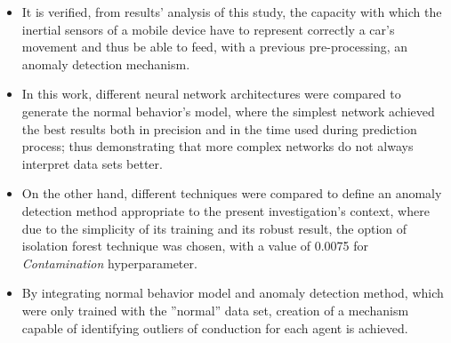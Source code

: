 \begin{itemize}
\item It is verified, from results' analysis of this study, the capacity with which the inertial sensors of a mobile device have to represent correctly a car's movement and thus be able to feed, with a previous pre-processing, an anomaly detection mechanism.
\item In this work, different neural network architectures were compared to generate the normal behavior's model, where the simplest network achieved the best results both in precision and in the time used during prediction process; thus demonstrating that more complex networks do not always interpret data sets better.
\item On the other hand, different techniques were compared to define an anomaly detection method appropriate to the present investigation's context, where due to the simplicity of its training and its robust result, the option of isolation forest technique was chosen, with a value of 0.0075 for \textit{Contamination} hyperparameter.
\item By integrating normal behavior model and anomaly detection method, which were only trained with the ''normal'' data set, creation of a mechanism capable of identifying outliers of conduction for each agent is achieved.

\end{itemize}

